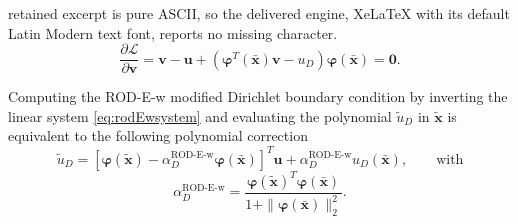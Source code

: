 \documentclass[10pt,a4paper]{amsart}
\renewcommand{\phi}{\varphi}
\begin{document}
retained excerpt is pure ASCII, so the delivered engine, XeLaTeX with its default Latin Modern text font, reports no missing character.
\begin{equation}\label{eq:rodEwsystem}
    \frac{\partial \mathcal{L}}{\partial \boldsymbol{v}} = \boldsymbol{v} - \boldsymbol{u} + (\boldsymbol{\phi}^T(\bar{\boldsymbol{x}}) \boldsymbol{v} - u_D) \boldsymbol{\phi}(\bar{\boldsymbol{x}}) = \boldsymbol{0}.
\end{equation}

\begin{proposition}
Computing the ROD-E-w modified Dirichlet boundary condition by inverting the linear system \eqref{eq:rodEwsystem} and evaluating the polynomial $\tilde u_D$ in $\tilde{\boldsymbol{x}}$ is equivalent to the following polynomial correction
\begin{equation}\label{eq:rodEw_final}
    \tilde u_D = [\boldsymbol{\phi}(\tilde{\boldsymbol{x}}) - \alpha_D^{\text{ROD-E-w}} \boldsymbol{\phi}(\bar{\boldsymbol{x}})]^T \boldsymbol{u} + \alpha_D^{\text{ROD-E-w}} u_D(\bar{\boldsymbol{x}}) , \quad \quad \text{with}
\end{equation}
\begin{equation}\label{eq:alpha_rod_e_w}
    \alpha_D^{\text{ROD-E-w}} = \frac{\boldsymbol{\phi}(\tilde{\boldsymbol{x}})^T \boldsymbol{\phi}(\bar{\boldsymbol{x}})}{1+\|\boldsymbol{\phi}(\bar{\boldsymbol{x}})\|^2_2}   .
\end{equation}
\end{proposition}
\end{document}
